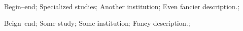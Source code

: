 \addeducation%
{%
    Begin--end;%
    Specialized studies;%
    Another institution;%
    Even fancier description.;%
}%

\addeducation%
{%
    Beign--end;%
    Some study;%
    Some institution;%
    Fancy description.;%
}%
